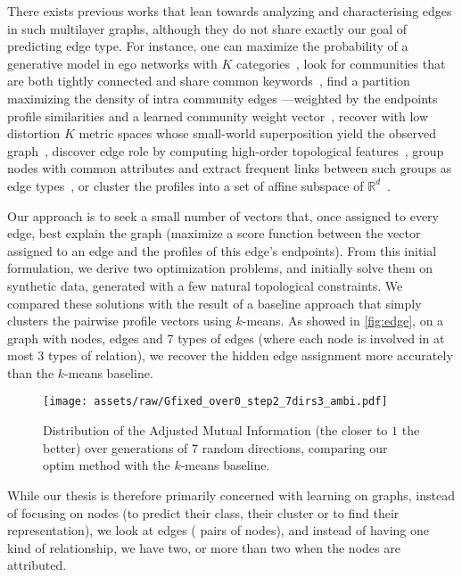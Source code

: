 There exists previous works that lean towards analyzing and characterising edges in such multilayer
graphs, although they do not share exactly our goal of predicting edge type. For instance, one can
maximize the probability of a generative model in ego networks with $K$
categories~\autocites{LeskovecEgo12}{LeskovecEgo14}, look for communities that are both tightly
connected and share common keywords~\autocite{AttributedCommunity16}, find a partition maximizing
the density of intra community edges ---weighted by the endpoints profile similarities and a learned
community weight vector~\autocite{ZhangModelFree16}, recover with low distortion $K$ metric spaces
whose small-world superposition yield the observed graph~\autocite{Abraham2012a}, discover edge role
by computing high-order topological features~\autocite{ahmed2017roles}, group nodes with common
attributes and extract frequent links between such groups as edge types~\autocite{conceptualLinks12},
or cluster the profiles into a set of affine subspace of $\mathbb{R}^d$~\autocite{SCSurvey11}.

Our approach is to seek a small number of vectors that, once assigned to every edge, best explain
the graph (\ie maximize a score function between the vector assigned to an edge  and the profiles of
this edge's endpoints).
From this initial formulation, we derive two optimization problems, and initially solve them on
synthetic data, generated with a few natural topological constraints. We compared these solutions
with the result of a baseline approach that simply clusters the pairwise profile vectors using
$k$-means. As showed in \autoref{fig:edge}, on a graph with  nodes,  edges and 7
types of edges (where each node is involved in at most 3 types of relation), we recover the hidden
edge assignment more accurately than the $k$-means baseline.

\begin{figure}[htpb]
  \centering
  \texttt{[image: assets/raw/Gfixed\_over0\_step2\_7dirs3\_ambi.pdf]}
  \caption{Distribution of the Adjusted Mutual Information (the closer to $1$ the better) over
   generations of 7 random directions, comparing our \textsf{optim} method with the $k$-means
baseline. \label{fig:edge}}
\end{figure}

While our thesis is therefore primarily concerned with learning on graphs, instead of focusing on
nodes (to predict their class, their cluster or to find their representation), we look at edges (\ie
pairs of nodes), and instead of having one kind of relationship, we have two, or more than two when
the nodes are attributed.
